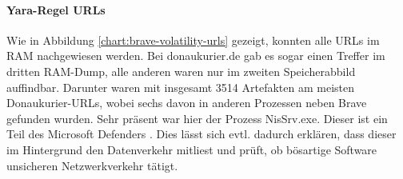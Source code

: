 \paragraph*{Yara-Regel \glqq{}URLs\grqq{}}\label{chap:ergebnisse-brave-uncommon-locations-volatility-urls}

Wie in Abbildung \ref{chart:brave-volatility-urls} gezeigt, konnten alle URLs im RAM nachgewiesen werden. Bei \glqq{}donaukurier.de\grqq{} gab es sogar einen Treffer im dritten RAM-Dump, alle anderen waren nur im zweiten Speicherabbild auffindbar. Darunter waren mit insgesamt 3514 Artefakten am meisten Donaukurier-URLs, wobei sechs davon in anderen Prozessen neben Brave gefunden wurden. Sehr präsent war hier der Prozess \glqq{}NisSrv.exe\grqq{}. Dieser ist ein Teil des Microsoft Defenders \cite{pogonin2022microsoft}. Dies lässt sich evtl. dadurch erklären, dass dieser im Hintergrund den Datenverkehr mitliest und prüft, ob bösartige Software unsicheren Netzwerkverkehr tätigt.

